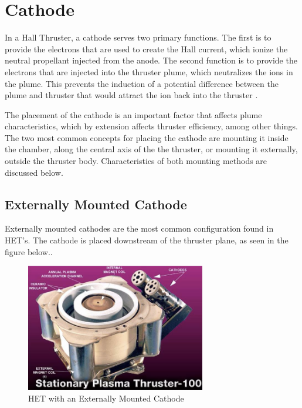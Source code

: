 \section{Cathode}

In a Hall Thruster, a cathode serves two primary functions. The first is to provide the electrons that are used to create the Hall current, which ionize the neutral propellant injected from the anode. The second function is to provide the electrons that are injected into the thruster plume, which neutralizes the ions in the plume. This prevents the induction of a potential difference between the plume and thruster that would attract the ion back into the thruster \cite{AIAA2008-5188}. 

The placement of the cathode is an important factor that affects plume characteristics, which by extension affects thruster efficiency, among other things. The two most common concepts for placing the cathode are mounting it inside the chamber, along the central axis of the the thruster, or mounting it externally, outside the thruster body. Characteristics of both mounting methods are discussed below.

\subsection{Externally Mounted Cathode}

Externally mounted cathodes are the most common configuration found in \ac{HET}'s. The cathode is placed downstream of the thruster plane, as seen in the figure below.. 

\begin{figure}[H]
    \centering
    \includegraphics[width=0.7\textwidth]{images/Concepts/ExternalCathode.png}
    \captionsetup{justification=centering}
    \caption{\ac{HET} with an Externally Mounted Cathode \cite{ExternalCathodePic}}
    \label{fig:external_cathode}
\end{figure}

